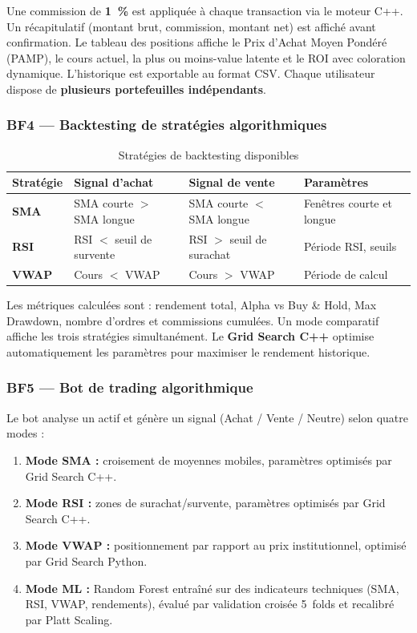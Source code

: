 \documentclass[a4paper, 12pt, twoside]{article}
\begin{document}
    Une commission de \textbf{1~\%} est appliquée à chaque transaction via le
    moteur C++. Un récapitulatif (montant brut, commission, montant net) est
    affiché avant confirmation. Le tableau des positions affiche le Prix
    d'Achat Moyen Pondéré (PAMP), le cours actuel, la plus ou moins-value
    latente et le ROI avec coloration dynamique. L'historique est exportable
    au format CSV. Chaque utilisateur dispose de \textbf{plusieurs
    portefeuilles indépendants}.

    \subsubsection*{BF4 --- Backtesting de stratégies algorithmiques}

    \begin{table}[h]
    \centering
    \begin{tabular}{|>{\bfseries}l|l|l|p{3.5cm}|}
    \hline
    Stratégie & Signal d'achat & Signal de vente & Paramètres \\
    \hline
    SMA & SMA courte $>$ SMA longue & SMA courte $<$ SMA longue
        & Fenêtres courte et longue \\
    \hline
    RSI & RSI $<$ seuil de survente & RSI $>$ seuil de surachat
        & Période RSI, seuils \\
    \hline
    VWAP & Cours $<$ VWAP & Cours $>$ VWAP
         & Période de calcul \\
    \hline
    \end{tabular}
    \caption{Stratégies de backtesting disponibles}
    \end{table}

    Les métriques calculées sont : rendement total, Alpha vs Buy \& Hold,
    Max Drawdown, nombre d'ordres et commissions cumulées. Un mode comparatif
    affiche les trois stratégies simultanément. Le \textbf{Grid Search C++}
    optimise automatiquement les paramètres pour maximiser le rendement
    historique.

    \subsubsection*{BF5 --- Bot de trading algorithmique}

    Le bot analyse un actif et génère un signal (Achat / Vente / Neutre)
    selon quatre modes :
    \begin{enumerate}
        \item \textbf{Mode SMA :} croisement de moyennes mobiles, paramètres
              optimisés par Grid Search C++.
        \item \textbf{Mode RSI :} zones de surachat/survente, paramètres
              optimisés par Grid Search C++.
        \item \textbf{Mode VWAP :} positionnement par rapport au prix
              institutionnel, optimisé par Grid Search Python.
        \item \textbf{Mode ML :} Random Forest entraîné sur des indicateurs
              techniques (SMA, RSI, VWAP, rendements), évalué par validation
              croisée 5~folds et recalibré par Platt Scaling.
    \end{enumerate}
\end{document}

